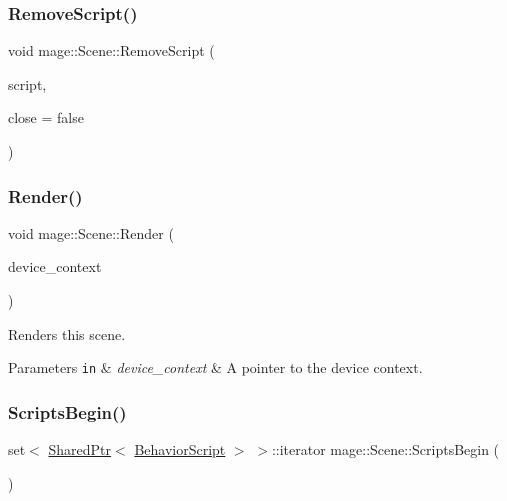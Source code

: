 \hypertarget{classmage_1_1_scene_a90808e9356fae9b156a6e23c03950f77}{}\label{classmage_1_1_scene_a90808e9356fae9b156a6e23c03950f77} 
\subsubsection{\texorpdfstring{Remove\+Script()}{RemoveScript()}\hspace{0.1cm}{\footnotesize\ttfamily [2/2]}}
{\footnotesize\ttfamily void mage\+::\+Scene\+::\+Remove\+Script (\begin{DoxyParamCaption}\item[{\hyperlink{namespacemage_a1e01ae66713838a7a67d30e44c67703e}{Shared\+Ptr}$<$ \hyperlink{classmage_1_1_behavior_script}{Behavior\+Script} $>$}]{script,  }\item[{bool}]{close = {\ttfamily false} }\end{DoxyParamCaption})}

\hypertarget{classmage_1_1_scene_ada79dabc862e6bb873400ecbe774f5f7}{}\label{classmage_1_1_scene_ada79dabc862e6bb873400ecbe774f5f7} 
\subsubsection{\texorpdfstring{Render()}{Render()}}
{\footnotesize\ttfamily void mage\+::\+Scene\+::\+Render (\begin{DoxyParamCaption}\item[{\hyperlink{namespacemage_ae74f374780900893caa5555d1031fd79}{Com\+Ptr}$<$ I\+D3\+D11\+Device\+Context2 $>$}]{device\+\_\+context }\end{DoxyParamCaption})}

Renders this scene.


\begin{DoxyParams}[1]{Parameters}
\mbox{\tt in}  & {\em device\+\_\+context} & A pointer to the device context. \\
\hline
\end{DoxyParams}
\hypertarget{classmage_1_1_scene_a2f6106acc0e29378736cf8e9bbcd8c20}{}\label{classmage_1_1_scene_a2f6106acc0e29378736cf8e9bbcd8c20} 
\subsubsection{\texorpdfstring{Scripts\+Begin()}{ScriptsBegin()}\hspace{0.1cm}{\footnotesize\ttfamily [1/2]}}
{\footnotesize\ttfamily set$<$ \hyperlink{namespacemage_a1e01ae66713838a7a67d30e44c67703e}{Shared\+Ptr}$<$ \hyperlink{classmage_1_1_behavior_script}{Behavior\+Script} $>$ $>$\+::iterator mage\+::\+Scene\+::\+Scripts\+Begin (\begin{DoxyParamCaption}{ }\end{DoxyParamCaption})}

